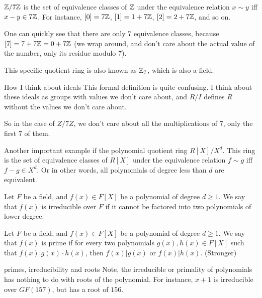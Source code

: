 \begin{example}
    $\mathbb{Z}/7\mathbb{Z}$ is the set of equivalence classes of $\mathbb{Z}$ under the equivalence relation
    $x\sim y$ iff $x-y\in 7\mathbb{Z}$. 
    For instance, $[0]=7\mathbb{Z}$, $[1]=1+7\mathbb{Z}$, $[2]=2+7\mathbb{Z}$, and so on.

    One can quickly see that there are only 7 equivalence classes, because $[7]=7+7\mathbb{Z}=0+7\mathbb{Z}$ (we wrap around, 
    and don't care about the actual value of the number, only its residue modulo 7).

    This specific quotient ring is also known as $\mathbb{Z}_7$, which is also a field.
\end{example}


\begin{bclogo}[logo=\bcinfo, couleurBarre=orange, noborder=true, couleur=white]{How I think about ideals}
    This formal definition is quite confusing. I think about these ideals as groups 
    with values we don't care about, and $R/I$ defines $R$ without 
    the values we don't care about.

    So in the case of $Z/7Z$, we don't care about 
    all the multiplications of $7$, only the first 7 of them.


    Another important example if the polynomial quotient ring $R[X]/X^d$. 
This ring is the set of equivalence classes of $R[X]$ under the equivalence relation
$f\sim g$ iff $f-g\in X^d$. Or in other words, all polynomials of degree less than $d$ are equivalent.
\end{bclogo}

\begin{definition}
    Let $F$ be a field, and $f(x)\in F[X]$ be a polynomial of degree $d\ge 1$.
    We say that $f(x)$ is irreducible over $F$ if it cannot be factored into 
    two polynomials of lower degree.
\end{definition}

\begin{definition}
    Let $F$ be a field, and $f(x)\in F[X]$ be a polynomial of degree $d\ge 1$.
    We say that $f(x)$ is prime if for every two polynomials $g(x),h(x)\in F[X]$
    such that $f(x)|g(x)\cdot h(x)$, then $f(x)|g(x)$ or $f(x)|h(x)$. (Stronger)
\end{definition}

\begin{bclogo}[logo=\bcinfo, couleurBarre=orange, noborder=true, couleur=white]{primes, irreducibility and roots}
Note, the irreducible or primality of polynomials has nothing to do with roots 
of the polynomial. For instance, $x+1$ is irreducible over $GF(157)$, but has 
a root of $156$.
\end{bclogo}

